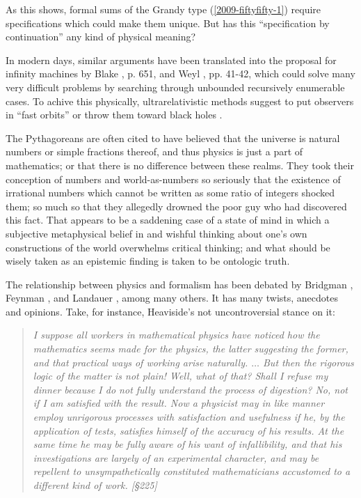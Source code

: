 As this shows, formal sums of the Grandy type (\ref{2009-fiftyfifty-1}) require specifications
which could make them unique.
But has this ``specification by continuation'' any kind of physical meaning?

In modern days, similar arguments have been translated into the proposal for
infinity machines  by
Blake \cite{Blake26}, p. 651,
and Weyl \cite{weyl:49}, pp. 41-42,
which could solve many very difficult problems by searching through unbounded recursively enumerable cases.
To achive this physically, ultrarelativistic methods suggest to put observers in ``fast orbits'' or throw them toward
black holes \cite{pit:90}.



The Pythagoreans are often cited to have believed that the universe is natural numbers or simple fractions thereof, and thus physics is just a part of mathematics; or that
there is no difference between these realms.
They took their conception of numbers and world-as-numbers so seriously that the existence of irrational numbers which cannot
be written as some ratio of integers shocked them; so much so that they allegedly drowned the poor guy who had discovered this fact.
That appears to be a saddening case of a state of mind in which a subjective metaphysical belief in and
wishful thinking about one's own constructions of the world overwhelms critical thinking;
and what should be wisely taken as an epistemic finding is taken to be ontologic truth.


The relationship between physics and formalism has been debated by
Bridgman \cite{bridgman},
Feynman \cite{feynman-computation},
and  Landauer \cite{landauer},
among many others.
It has many twists, anecdotes and opinions.
Take, for instance, Heaviside's not uncontroversial stance \cite{heaviside-EMT} on it:
\begin{quote}
{\em
I suppose all workers
in mathematical physics have noticed how the mathematics
seems made for the physics, the latter suggesting the former, and
that practical ways of working arise naturally. $\ldots$ But then the
rigorous logic of the matter is not plain! Well, what of that?
Shall I refuse my dinner because I do not fully understand the
process of digestion? No, not if I am satisfied with the result.
Now a physicist may in like manner employ unrigorous processes with satisfaction and usefulness if he, by the application
of tests, satisfies himself of the accuracy of his results. At
the same time he may be fully aware of his want of infallibility,
and that his investigations are largely of an experimental character, and may be repellent to unsympathetically
constituted mathematicians accustomed to a different kind
of work.  [\S 225]
}
\label{2013-m-ch-intro-cooking}
\end{quote}


